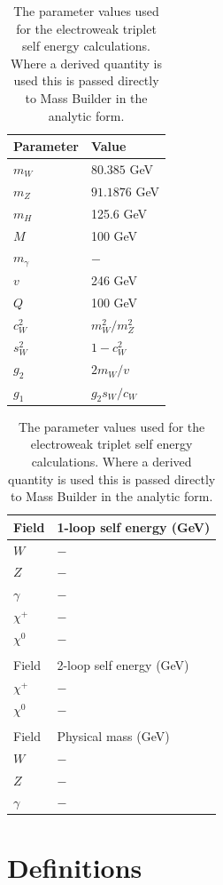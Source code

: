 \documentclass[11pt]{article}
\newcommand{\mb}{\textsf{Mass Builder} }
\begin{document}
\begin{table}[h!]
\caption{The parameter values used for the electroweak triplet self energy calculations.  Where a derived quantity is used this is passed directly to \mb in the analytic form.}\label{table:input_params}
\centering
\vspace{0.5cm}
\begin{tabular}{l l}
\hline
Parameter & Value\\
\hline
$m_W$ & $80.385$ GeV \\
$m_Z$ & $91.1876$ GeV \\
$m_H$ & 125.6 GeV\\
$M$ & 100 GeV\\
$m_{\gamma}$ & $-$ \\
$v$ & 246 GeV \\
$Q$ & 100 GeV \\
$c_W^2$ & $m^2_W/m^2_Z$ \\
$s_W^2$ & $1-c^2_W$ \\
$g_2$ & $2m_W/v$\\
$g_1$ & $g_2 s_W/c_W$\\
\hline\end{tabular}
\hspace{3cm}
\begin{tabular}{l l}
\hline
Field & 1-loop self energy (GeV)\\
\hline
$W$ & $-$ \\
$Z$ & $-$  \\
$\gamma$ & $-$ \\
$\chi^+$ & $-$ \\
$\chi^0$ & $-$ \\
&\\
\hline
Field & 2-loop self energy (GeV)\\
\hline
$\chi^+$ & $-$ \\
$\chi^0$ & $-$ \\
&\\
\hline
Field & Physical mass (GeV)\\
\hline
$W$ & $-$ \\
$Z$ & $-$  \\
$\gamma$ & $-$\\
\hline\end{tabular}
\end{table}


\newpage
\appendix
\section{Definitions}\label{sec:definitions}
\end{document}
